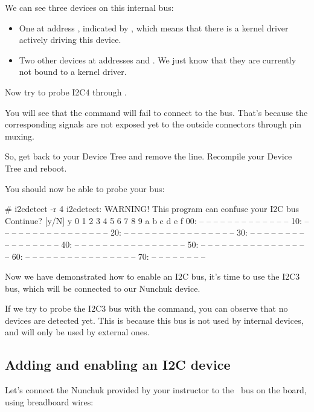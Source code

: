 We can see three devices on this internal bus:
\begin{itemize}
\item One at address , indicated by ,
      which means that there is a kernel driver actively
      driving this device.
\item Two other devices at addresses  and .
      We just know that they are currently not bound to a kernel driver.
\end{itemize}

Now try to probe I2C4  through .

You will see that the command will fail to connect to
the bus. That's because the corresponding signals are
not exposed yet to the outside connectors through pin muxing.

So, get back to your Device Tree and remove the  line. Recompile your
Device Tree and reboot.

You should now be able to probe your bus:

\begin{bashinput}
# i2cdetect -r 4
i2cdetect: WARNING! This program can confuse your I2C bus
Continue? [y/N] y
     0  1  2  3  4  5  6  7  8  9  a  b  c  d  e  f
00:          -- -- -- -- -- -- -- -- -- -- -- -- --
10: -- -- -- -- -- -- -- -- -- -- -- -- -- -- -- --
20: -- -- -- -- -- -- -- -- -- -- -- -- -- -- -- --
30: -- -- -- -- -- -- -- -- -- -- -- -- -- -- -- --
40: -- -- -- -- -- -- -- -- -- -- -- -- -- -- -- --
50: -- -- -- -- -- -- -- -- -- -- -- -- -- -- -- --
60: -- -- -- -- -- -- -- -- -- -- -- -- -- -- -- --
70: -- -- -- -- -- -- -- --
\end{bashinput}

Now we have demonstrated how to enable an I2C bus, it's time to
use the I2C3 bus, which will be connected to our Nunchuk device.

If we try to probe the I2C3 bus with the 
command, you can observe that no devices are detected yet.
This is because this bus is not used by internal devices, and will
only be used by external ones.

\subsection{Adding and enabling an I2C device}

Let's connect the Nunchuk provided by your instructor
to the \busname\ bus on the board, using breadboard wires:

